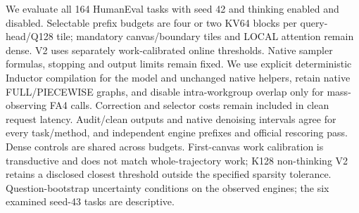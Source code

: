 We evaluate all 164 HumanEval tasks with seed 42 and thinking enabled and disabled. Selectable prefix budgets are four or two KV64 blocks per query-head/Q128 tile; mandatory canvas/boundary tiles and LOCAL attention remain dense. V2 uses separately work-calibrated online thresholds. Native sampler formulas, stopping and output limits remain fixed. We use explicit deterministic Inductor compilation for the model and unchanged native helpers, retain native FULL/PIECEWISE graphs, and disable intra-workgroup overlap only for mass-observing FA4 calls. Correction and selector costs remain included in clean request latency. Audit/clean outputs and native denoising intervals agree for every task/method, and independent engine prefixes and official rescoring pass. Dense controls are shared across budgets. First-canvas work calibration is transductive and does not match whole-trajectory work; K128 non-thinking V2 retains a disclosed closest threshold outside the specified sparsity tolerance. Question-bootstrap uncertainty conditions on the observed engines; the six examined seed-43 tasks are descriptive.
